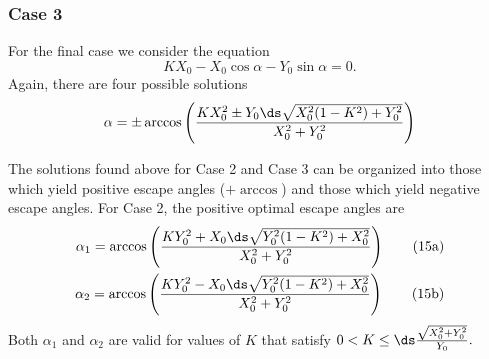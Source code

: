 \subsubsection{Case 3}
For the final case we consider the equation 
%
\begin{equation}
K X_0 - X_0 \cos \alpha - Y_0 \sin\alpha = 0.
\end{equation}
%
Again, there are four possible solutions
%
\begin{equation}
\alpha = \pm \arccos \left( \frac{K X_0^2 \pm Y_0 
\ds \sqrt{X_0^2(1-K^2) +Y_0^2}}{X_0^2+Y_0^2} \right )
\end{equation}
%

The solutions found above for Case 2 and Case 3 can be organized into those which yield positive escape angles ($+ \arccos$) and those which yield negative escape angles. For Case 2, the positive optimal escape angles are 
%
\begin{align}
\alpha_{1} =  \arccos \left( \frac{K Y_0^2 +X_0 
\ds\sqrt{Y_0^2(1- K^2) + X_0^2 }}{X_0^2+Y_0^2} \right )
\tag{15a} \label{root_a} \\
\alpha_{2} = \arccos \left(\frac{K Y_0^2 - X_0 
\ds\sqrt{Y_0^2(1- K^2) + X_0^2 }}{X_0^2+Y_0^2} \right )
\tag{15b} \label{root_b}
\end{align}
%
Both $\alpha_1$ and $\alpha_2$ are valid for values of $K$ that satisfy 
$0< K \leq \ds \frac{\sqrt{X_0^2 + Y_0^2}}{Y_0}.$

